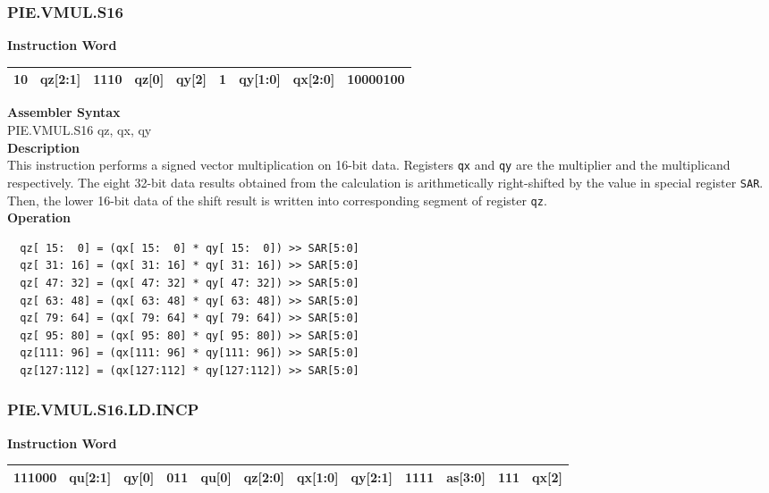 \newpage
\subsubsection{PIE.VMUL.S16}\label{instruction:PIEVMULS16}
\setlength\tabcolsep{6pt}
\textbf{Instruction Word} \\
\begin{tabular}{|c|c|c|c|c|c|c|c|c|}
	\hline
	10 & qz[2:1] & 1110 & qz[0] & qy[2] & 1 & qy[1:0] & qx[2:0] & 10000100 \\
	\hline
\end{tabular}

\textbf{Assembler Syntax} \\
PIE.VMUL.S16 qz, qx, qy \\
\textbf{Description} \\
This instruction performs a signed vector multiplication on 16-bit data. Registers \lstinline{qx} and \lstinline{qy} are the multiplier and the multiplicand respectively. The eight 32-bit data results obtained from the calculation is arithmetically right-shifted by the value in special register \lstinline{SAR}. Then, the lower 16-bit data of the shift result is written into corresponding segment of register \lstinline{qz}.\\
\textbf{Operation}
\begin{lstlisting}
  qz[ 15:  0] = (qx[ 15:  0] * qy[ 15:  0]) >> SAR[5:0]
  qz[ 31: 16] = (qx[ 31: 16] * qy[ 31: 16]) >> SAR[5:0]
  qz[ 47: 32] = (qx[ 47: 32] * qy[ 47: 32]) >> SAR[5:0]
  qz[ 63: 48] = (qx[ 63: 48] * qy[ 63: 48]) >> SAR[5:0]
  qz[ 79: 64] = (qx[ 79: 64] * qy[ 79: 64]) >> SAR[5:0]
  qz[ 95: 80] = (qx[ 95: 80] * qy[ 95: 80]) >> SAR[5:0]
  qz[111: 96] = (qx[111: 96] * qy[111: 96]) >> SAR[5:0]
  qz[127:112] = (qx[127:112] * qy[127:112]) >> SAR[5:0]
\end{lstlisting}

\newpage
\subsubsection{PIE.VMUL.S16.LD.INCP}\label{instruction:PIEVMULS16LDINCP}
\setlength\tabcolsep{6pt}
\textbf{Instruction Word} \\
\begin{tabular}{|c|c|c|c|c|c|c|c|c|c|c|c|}
	\hline
	111000 & qu[2:1] & qy[0] & 011 & qu[0] & qz[2:0] & qx[1:0] & qy[2:1] & 1111 & as[3:0] & 111 & qx[2] \\
	\hline
\end{tabular}

